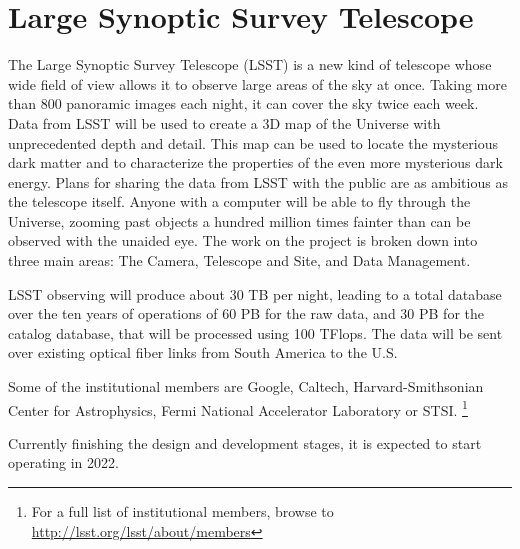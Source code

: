 \section{Large Synoptic Survey Telescope}

The Large Synoptic Survey Telescope (LSST) is a new kind of telescope whose wide field of view allows it to observe large areas of the sky at once. Taking more than 800 panoramic images each night, it can cover the sky twice each week. Data from LSST will be used to create a 3D map of the Universe with unprecedented depth and detail. This map can be used to locate the mysterious dark matter and to characterize the properties of the even more mysterious dark energy. Plans for sharing the data from LSST with the public are as ambitious as the telescope itself. Anyone with a computer will be able to fly through the Universe, zooming past objects a hundred million times fainter than can be observed with the unaided eye. The work on the project is broken down into three main areas: The Camera, Telescope and Site, and Data Management. \newline

LSST observing will produce about 30 TB per night, leading to a total database over the ten years of operations of 60 PB for the raw data, and 30 PB for the catalog database, that will be processed using 100 TFlops. The data will be sent over existing optical fiber links from South America to the U.S. \newline

Some of the institutional members are Google, Caltech, Harvard-Smithsonian Center for Astrophysics, Fermi National Accelerator Laboratory or STSI. \footnote{For a full list of institutional members, browse to \url{http://lsst.org/lsst/about/members}}  \newline

Currently finishing the design and development stages, it is expected to start operating in 2022.